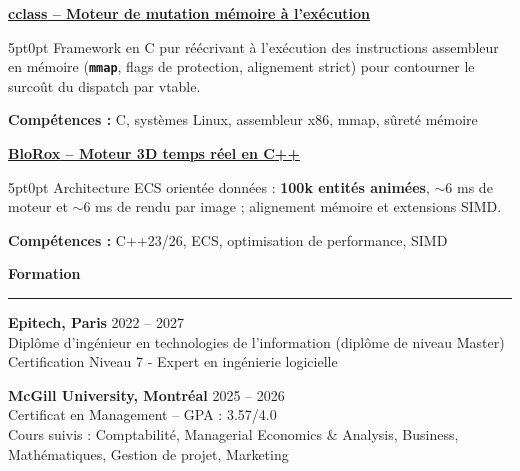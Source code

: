 \documentclass[9pt]{extarticle}
\begin{document}
\par\vspace{8pt}

\underline{\bfseries \href{https://github.com/paulogarithm/cclass}{cclass} -- Moteur de mutation mémoire à l'exécution}
\par
\begin{adjustwidth}{5pt}{0pt}
    Framework en C pur réécrivant à l'exécution des instructions assembleur en mémoire ({\bfseries \texttt{mmap}}, flags de protection, alignement strict) pour contourner le surcoût du dispatch par vtable.
\end{adjustwidth}
\par
{\bfseries Compétences :} C, systèmes Linux, assembleur x86, mmap, sûreté mémoire

\par\vspace{8pt}

\underline{\bfseries \href{https://github.com/paulogarithm/blorox}{BloRox} -- Moteur 3D temps réel en C++}
\par
\begin{adjustwidth}{5pt}{0pt}
    Architecture ECS orientée données : {\bfseries 100k entités animées}, $\sim$6 ms de moteur et $\sim$6 ms de rendu par image ; alignement mémoire et extensions SIMD.
\end{adjustwidth}
\par
{\bfseries Compétences :} C++23/26, ECS, optimisation de performance, SIMD

\par\vspace{8pt}



{\large\bfseries Formation}
\par\vspace{-8pt}
\rule{\linewidth}{0.4pt}
\par\vspace{5pt}

{\bfseries Epitech, Paris} \hfill 2022 -- 2027 \\
Diplôme d'ingénieur en technologies de l'information (diplôme de niveau Master) \\
Certification Niveau 7 - Expert en ingénierie logicielle

\vspace{6pt}

{\bfseries McGill University, Montréal} \hfill 2025 -- 2026 \\
Certificat en Management -- GPA : 3.57/4.0 \\
Cours suivis : Comptabilité, Managerial Economics \& Analysis, Business, Mathématiques, Gestion de projet, Marketing
\end{document}
